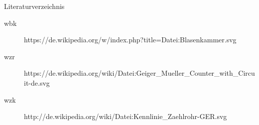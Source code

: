 \documentclass{beamer}
\begin{document}
\begin{frame}{Literaturverzeichnis}
	\begin{adjustwidth}{-5em}{-2em}
	  	\begin{description}
		  	\item[wbk]
		  	https://de.wikipedia.org/w/index.php?title=Datei:Blasenkammer.svg
		  	\item[wzr]
		  	https://de.wikipedia.org/wiki/Datei:Geiger\_Mueller\_Counter\_with\_Circuit-de.svg
		  	\item[wzk]
			http://de.wikipedia.org/wiki/Datei:Kennlinie\_Zaehlrohr-GER.svg
		\end{description}
	\end{adjustwidth}  
\end{frame}
\end{document}
